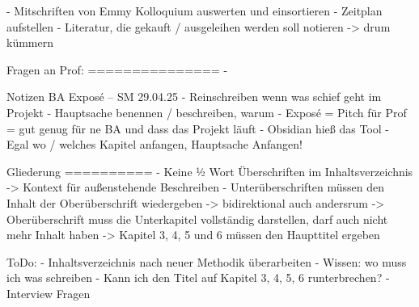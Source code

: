 - Mitschriften von Emmy Kolloquium auswerten und einsortieren
- Zeitplan aufstellen
- Literatur, die gekauft / ausgeleihen werden soll notieren
  -> drum kümmern

Fragen an Prof:
===============
- 

Notizen BA Exposé – SM 29.04.25
-	Reinschreiben wenn was schief geht im Projekt
-	Hauptsache benennen / beschreiben, warum
-	Exposé = Pitch für Prof = gut genug für ne BA und dass das Projekt läuft
-	Obsidian hieß das Tool
-	Egal wo / welches Kapitel anfangen, Hauptsache Anfangen!

Gliederung
==========
-	Keine ½ Wort Überschriften im Inhaltsverzeichnis
    -> Kontext für außenstehende Beschreiben
-	Unterüberschriften müssen den Inhalt der Oberüberschrift wiedergeben
    -> bidirektional auch andersrum
    -> Oberüberschrift muss die Unterkapitel vollständig darstellen, darf auch nicht mehr Inhalt haben
    -> Kapitel 3, 4, 5 und 6 müssen den Haupttitel ergeben

ToDo:
-	Inhaltsverzeichnis nach neuer Methodik überarbeiten
-	Wissen: wo muss ich was schreiben
-	Kann ich den Titel auf Kapitel 3, 4, 5, 6 runterbrechen?
- Interview Fragen
